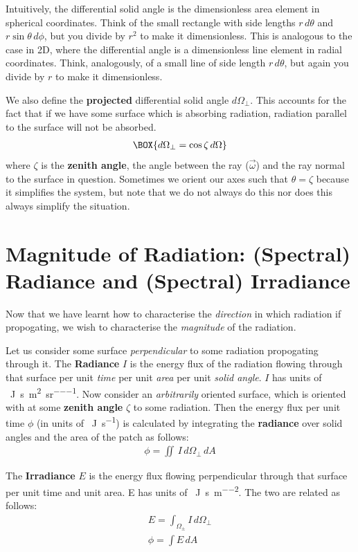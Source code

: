 Intuitively, the differential solid angle is the dimensionless area element in spherical coordinates. Think of the small rectangle with side lengths $r\,d\theta$ and $r\sin\theta \,d\phi$, but you divide by $r^2$ to make it dimensionless. This is analogous to the case in 2D, where the differential angle is a dimensionless line element in radial coordinates. Think, analogously, of a small line of side length $r\,d\theta$, but again you divide by $r$ to make it dimensionless.

We also define the \textbf{projected} differential solid angle $d\Omega_\perp$. This accounts for the fact that if we have some surface which is absorbing radiation, radiation parallel to the surface will not be absorbed.
\begin{align}
    \BOX{d\Omega_\perp=\cos\zeta\,d\Omega}
\end{align}
where $\zeta$ is the \textbf{zenith angle}, the angle between the ray ($\vec{\omega}$) and the ray normal to the surface in question. Sometimes we orient our axes such that $\theta=\zeta$ because it simplifies the system, but note that we do not always do this nor does this always simplify the situation.

\section{Magnitude of Radiation: (Spectral) Radiance and (Spectral) Irradiance}

Now that we have learnt how to characterise the \textit{direction} in which radiation if propogating, we wish to characterise the \textit{magnitude} of the radiation. 

Let us consider some surface \textit{perpendicular} to some radiation propogating through it. The \textbf{Radiance} $I$ is the energy flux of the radiation flowing through that surface per unit \textit{time} per unit \textit{area} per unit \textit{solid angle}. $I$ has units of \qty{}{\joule\per\second\per\metre\squared\per\steradian}. Now consider an \textit{arbitrarily} oriented surface, which is oriented with at some \textbf{zenith angle} $\zeta$ to some radiation. Then the energy flux per unit time $\phi$ (in units of \qty{}{\joule\per\second}) is calculated by integrating the \textbf{radiance} over solid angles and the area of the patch as follows:
\begin{align}
\phi=\iint\,I\,d\Omega_\perp\,dA
\end{align}

The \textbf{Irradiance} $E$ is the energy flux flowing perpendicular through that surface per unit time and unit area. E has units of \qty{}{\joule\per\second\per\metre\squared}. The two are related as follows:
\begin{gather*}
    E=\int_{\Omega_\pm} I\,d\Omega_\perp \\
    \phi=\int E\,dA
\end{gather*}

